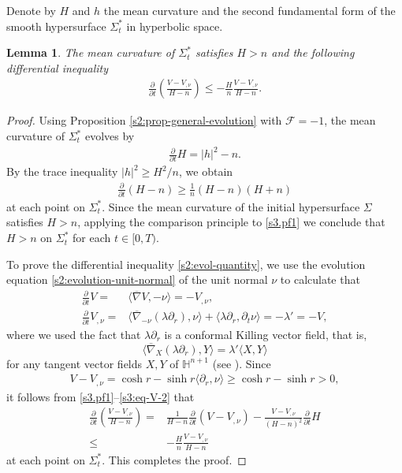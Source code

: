 \documentclass[11pt,reqno]{amsart}
\newtheorem{lem}[thm]{Lemma}
\theoremstyle{definition}
\theoremstyle{remark}
\numberwithin{equation}{section}
\renewcommand{\(}{\left(}
\renewcommand{\)}{\right)}
\renewcommand{\~}{\widetilde}
\renewcommand{\-}{\overline}
\renewcommand{\l}{\lambda}
\renewcommand{\l}{\lambda}
\begin{document}
Denote by $H$ and $h$ the mean curvature and the second fundamental form of the smooth hypersurface $\Sigma_t^\ast$ in hyperbolic space.
\begin{lem}\label{s3:prop-differential-ineq}
	The mean curvature of $\Sigma_t^\ast$ satisfies $H>n$ and the following differential inequality
	\begin{align}\label{s2:evol-quantity}
	\frac{\partial}{\partial t}\(\frac{V-V_{,\nu}}{H-n}\)\leq -\frac{H}{n}\frac{V-V_{,\nu}}{H-n}.
	\end{align}
\end{lem}
\begin{proof}
    Using Proposition \ref{s2:prop-general-evolution} with $\mathcal F=-1$, the mean curvature of $\Sigma_t^\ast$ evolves by
	\begin{align*}
	\frac{\partial}{\partial t}H=|h|^2-n.
	\end{align*}
	By the trace inequality $|h|^2\geq H^2/n$, we obtain
	\begin{align}\label{s3.pf1}
	\frac{\partial}{\partial t}(H-n)\geq \frac{1}{n}(H-n)(H+n)
	\end{align}
	at each point on $\Sigma_t^\ast$. Since the mean curvature of the initial hypersurface $\Sigma$ satisfies $H>n$, applying the comparison principle to \eqref{s3.pf1} we conclude that $H>n$ on $\Sigma_t^{\ast}$ for each $t\in [0,T)$.
	
    To prove the differential inequality \eqref{s2:evol-quantity}, we use the evolution equation \eqref{s2:evolution-unit-normal} of the unit normal $\nu$ to calculate that
	\begin{align}
	\frac{\partial}{\partial t}V=&\langle \-\nabla V,-\nu\rangle=-V_{,\nu}, \label{s3:eq-V-1}\\
	\frac{\partial}{\partial t}V_{,\nu}=&\langle \-\nabla_{-\nu}(\l \partial_r), \nu\rangle+\langle \l\partial_r,\partial_t\nu\rangle=-\l'=-V,\label{s3:eq-V-2}
	\end{align}
	where we used the fact that $\l\partial_r$ is a conformal Killing vector field, that is,
\begin{equation}\label{s3.conf}
  \langle\overline{\nabla}_X(\lambda\partial_r),Y\rangle=\lambda'\langle X,Y\rangle
\end{equation}
for any tangent vector fields $X,Y$ of $\mathbb{H}^{n+1}$ (see \cite[Lemma 2.2]{Bre13}). Since
\begin{align*}
V-V_{,\nu}=\cosh r-\sinh r\langle \partial_r,\nu\rangle\geq \cosh r-\sinh r>0,
\end{align*}
it follows from \eqref{s3.pf1}--\eqref{s3:eq-V-2} that
	\begin{align*}
	\frac{\partial}{\partial t}\(\frac{V-V_{,\nu}}{H-n}\)=&\frac{1}{H-n}\frac{\partial}{\partial t}(V-V_{,\nu})-\frac{V-V_{,\nu}}{(H-n)^2}\frac{\partial}{\partial t}H \\
\leq &-\frac{H}{n}\frac{V-V_{,\nu}}{H-n}
	\end{align*}
    at each point on $\Sigma_t^\ast$. This completes the proof.	
\end{proof}
\end{document}
